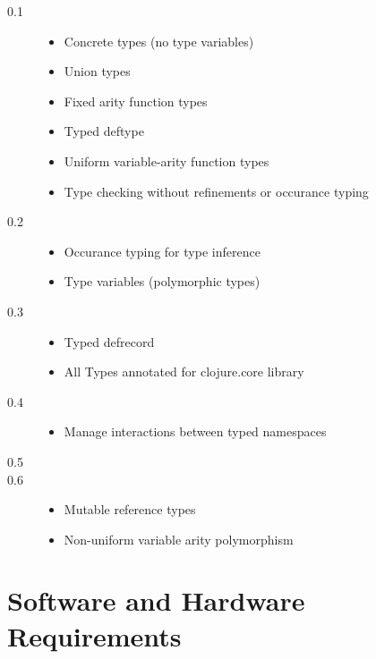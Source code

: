 \documentclass[12pt, a4paper]{article}
\begin{document}
\begin{description}
\item[0.1]
	\begin{itemize}
	\item Concrete types (no type variables)
	\item Union types
	\item Fixed arity function types
	\item Typed deftype
	\item Uniform variable-arity function types
	\item Type checking without refinements or occurance typing
	\end{itemize}
\item[0.2]
	\begin{itemize}
	\item Occurance typing for type inference
	\item Type variables (polymorphic types)
	\end{itemize}
\item[0.3]
	\begin{itemize}
	\item Typed defrecord
	\item All Types annotated for clojure.core library
	\end{itemize}
\item[0.4]
	\begin{itemize}
	\item Manage interactions between typed namespaces
	\end{itemize}
\item[0.5]
	\begin{itemize}
	\end{itemize}
\item[0.6]
	\begin{itemize}
	\item Mutable reference types
	\item Non-uniform variable arity polymorphism
	\end{itemize}

\end{description}
\section*{Software and Hardware Requirements}
\end{document}
